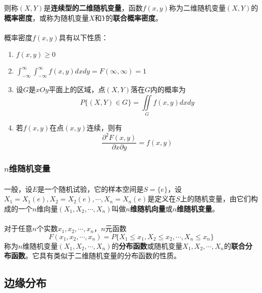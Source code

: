 则称$(X,Y)$是\textbf{连续型的二维随机变量}，函数$f(x,y)$称为二维随机变量$(X,Y)$的\textbf{概率密度}，或称为随机变量$X$和$Y$的\textbf{联合概率密度}。

\paragraph{}
概率密度$f(x,y)$具有以下性质：
\begin{enumerate}
  \item $f(x,y) \geq 0$
  \item $\int_{-\infty}^\infty\int_{-\infty}^\infty f(x,y)dxdy=F(\infty,\infty)=1$
  \item 设$G$是$xOy$平面上的区域，点$(X,Y)$落在$G$内的概率为
  \begin{equation}
    P\{(X,Y)\in G\} = \iint\limits_G f(x,y)dxdy
  \end{equation}
  \item 若$f(x,y)$在点$(x,y)$连续，则有
  \begin{equation}
    \frac{\partial^2F(x,y)}{\partial x\partial y} = f(x,y)
  \end{equation}
\end{enumerate}

\subsubsection{$n$维随机变量}
\paragraph{}
一般，设$E$是一个随机试验，它的样本空间是$S=\{e\}$，设$X_1=X_1(e), X_2=X_2(e),\cdots,X_n=X_n(e)$是定义在$S$上的随机变量，由它们构成的一个$n$维向量$(X_1,X_2,\cdots,X_n)$叫做\textbf{$n$维随机向量}或\textbf{$n$维随机变量}。
\paragraph{}
对于任意$n$个实数$x_1,x_2,\cdots,x_n$，$n$元函数
\begin{equation}
  F(x_1,x_2,\cdots,x_n)=P\{X_1 \leq  x_1, X_2 \leq x_2, \cdots, X_n \leq x_n\}
\end{equation}
称为$n$维随机变量$(X_1,X_2,\cdots,X_n)$的\textbf{分布函数}或随机变量$X_1,X_2,\cdots,X_n$的\textbf{联合分布函数}。它具有类似于二维随机变量的分布函数的性质。

\subsection{边缘分布}
